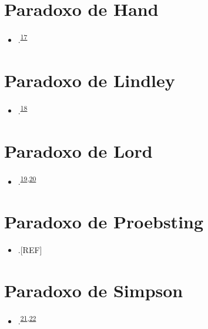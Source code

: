 \documentclass[
  a4paper,
]{book}
\providecommand{\tightlist}{%
  \setlength{\itemsep}{0pt}\setlength{\parskip}{0pt}}
\begin{document}
\hypertarget{hand}{%
\section{Paradoxo de Hand}\label{hand}}

\begin{itemize}
\tightlist
\item
  .\textsuperscript{\protect\hyperlink{ref-hand1992}{17}}
\end{itemize}

\hypertarget{lindley}{%
\section{Paradoxo de Lindley}\label{lindley}}

\begin{itemize}
\tightlist
\item
  .\textsuperscript{\protect\hyperlink{ref-lindley1957}{18}}
\end{itemize}

\hypertarget{lord}{%
\section{Paradoxo de Lord}\label{lord}}

\begin{itemize}
\tightlist
\item
  .\textsuperscript{\protect\hyperlink{ref-lord1967}{19},\protect\hyperlink{ref-lord1969}{20}}
\end{itemize}

\hypertarget{proebsting}{%
\section{Paradoxo de Proebsting}\label{proebsting}}

\begin{itemize}
\tightlist
\item
  .{[}REF{]}
\end{itemize}

\hypertarget{simpson}{%
\section{Paradoxo de Simpson}\label{simpson}}

\begin{itemize}
\tightlist
\item
  .\textsuperscript{\protect\hyperlink{ref-simpson1951}{21},\protect\hyperlink{ref-blyth1972}{22}}
\end{itemize}
\end{document}
